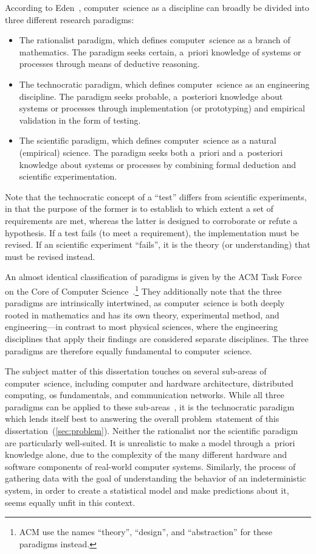 According to Eden~\cite{Eden2007}, computer~science as a discipline can broadly be divided into three different research paradigms:
\begin{itemize}
    \item The rationalist paradigm, which defines computer~science as a branch of mathematics. 
        The paradigm seeks certain, a~priori knowledge of systems or processes through means of deductive reasoning.
    \item The technocratic paradigm, which defines computer~science as an engineering discipline.
        The paradigm seeks probable, a~posteriori knowledge about systems or processes through implementation (or prototyping) and empirical validation in the form of testing.
    \item The scientific paradigm, which defines computer~science as a natural (empirical) science.
        The paradigm seeks both a~priori and a~posteriori knowledge about systems or processes by combining formal deduction and scientific experimentation.
\end{itemize}
Note that the technocratic concept of a ``test'' differs from scientific experiments, in that the purpose of the former is to establish to which extent a set of requirements are met, whereas the latter is designed to corroborate or refute a hypothesis.
If a test fails (to meet a requirement), the implementation must be revised. 
%
If an scientific experiment ``fails'', it is the theory (or understanding) that must be revised instead.


An almost identical classification of paradigms is given by the ACM Task Force on the Core of Computer Science~\cite{Comer1989}.\footnote{ACM use the names ``theory'', ``design'', and ``abstraction'' for these paradigms instead.}
%
They additionally note that the three paradigms are intrinsically intertwined, as computer~science is both deeply rooted in mathematics and has its own theory, experimental method, and engineering---in contrast to most physical sciences, where the engineering disciplines that apply their findings are considered separate disciplines.
%
The three paradigms are therefore equally fundamental to computer~science.



The subject matter of this dissertation touches on several sub-areas of computer~science, including computer and hardware architecture, distributed computing, \gls{os} fundamentals, and communication networks.
%
While all three paradigms can be applied to these sub-areas~\cite{Comer1989}, it is the technocratic paradigm which lends itself best to answering the overall problem~statement of this dissertation~(\cref{sec:problem}).
%
Neither the rationalist nor the scientific paradigm are particularly well-suited.
%
It is unrealistic to make a model through a~priori knowledge alone, due to the complexity of the many different hardware and software components of real-world computer systems.
%
Similarly, the process of gathering data with the goal of understanding the behavior of an indeterministic system, in order to create a statistical model and make predictions about it, seems equally unfit in this context.



